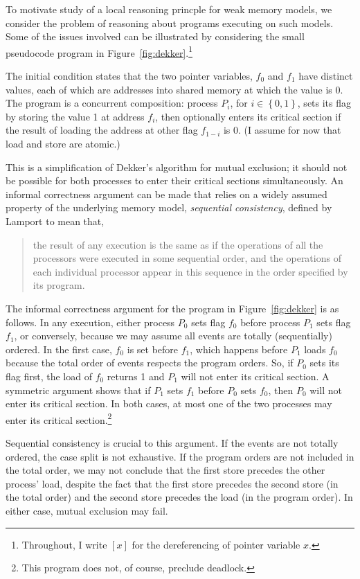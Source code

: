 \documentclass[11pt]{article}
\begin{document}
To motivate study of a local reasoning princple for weak memory models, we consider the problem of reasoning about programs executing on such models. Some of the issues involved can be illustrated by considering the small pseudocode program in Figure~\ref{fig:dekker}.\footnote{Throughout, I write $\left[ x \right]$ for the dereferencing of pointer variable $x$.}

The initial condition states that the two pointer variables, $f_0$ and $f_1$ have distinct values, each of which are addresses into shared memory at which the value is 0. The program is a concurrent composition: process $P_i$, for $i \in \left\lbrace 0,1 \right\rbrace$, sets its flag by storing the value 1 at address $f_i$, then optionally enters its critical section if the result of loading the address at other flag $f_{1-i}$ is 0. (I assume for now that load and store are atomic.)

This is a simplification of Dekker's algorithm for mutual exclusion; it should not be possible for both processes to enter their critical sections simultaneously. An informal correctness argument can be made that relies on a widely assumed property of the underlying memory model, \emph{sequential consistency}, defined by Lamport \cite{DBLP:journals/tc/Lamport79} to mean that, \begin{quotation}\noindent the result of any execution is the same as if the operations of all the processors were executed in some sequential order, and the operations of each individual processor appear in this sequence in the order specified by its program. \end{quotation}

The informal correctness argument for the program in Figure~\ref{fig:dekker} is as follows. In any execution, either process $P_0$ sets flag $f_0$ before process $P_1$ sets flag $f_1$, or conversely, because we may assume all events are totally (sequentially) ordered. In the first case, $f_0$ is set before $f_1$, which happens before $P_1$ loads $f_0$ because the total order of events respects the program orders. So, if $P_0$ sets its flag first, the load of $f_0$ returns 1 and $P_1$ will not enter its critical section. A symmetric argument shows that if $P_1$ sets $f_1$ before $P_0$ sets $f_0$, then $P_0$ will not enter its critical section. In both cases, at most one of the two processes may enter its critical section.\footnote{This program does not, of course, preclude deadlock.}

Sequential consistency is crucial to this argument. If the events are not totally ordered, the case split is not exhaustive. If the program orders are not included in the total order, we may not conclude that the first store precedes the other process' load, despite the fact that the first store precedes the second store (in the total order) and the second store precedes the load (in the program order). In either case, mutual exclusion may fail.
\end{document}
